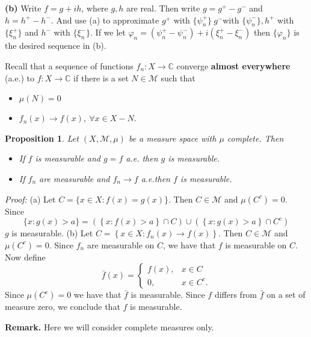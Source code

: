 \documentclass[12pt]{report}
\newtheorem{prop}[theorem]{Proposition}
\begin{document}
\bigskip
\noindent
\textbf{(b)}  Write $f = g + ih$, where $g, h$ are real.  Then write $g =
g^+ - g^-$ and
$h = h^+ - h^-$.  And use (a) to approximate $g^+$ with $\{\psi^+_n\}\ 
g^-$with
$\{\psi^-_n\}, h^+$ with $\{\xi^+_n\}$ and $h^-$ with $\{\xi^-_n\}$.  If we
let
$\varphi_n = (\psi^+_n - \psi_n^-) + i (\xi^+_n - \xi_n^-)$ then
$\{\varphi_n\}$ is the desired sequence in (b).


\medskip
\noindent Recall that a sequence of functions $f_n: X \longrightarrow
\mathbb{C}$ converge
\textbf{almost everywhere} (a.e.) to $f: X \longrightarrow \mathbb{C} $
if there is a set $N \in \mathcal{M}$ such that
\begin{itemize}
\item[(i)]  $\mu(N) = 0$
\item[(ii)]  $f_n (x) \longrightarrow f(x), \ \forall x \in X - N$.
\end{itemize}



\begin{prop}  Let $(X, \mathcal{M}, \mu)$ be a measure
space with
$\mu$ complete.  Then
\begin{itemize}
\item[(a)]   If $f$ is measurable and $g = f $ a.e. then $g$ is
measurable.
\item[(b)]   If $f_n$ are measurable and $f_n \longrightarrow f $
a.e.then $f$  is measurable.
\end{itemize}
\end{prop}

\textit{Proof:}  
(a) Let $C = \{x \in X: f(x) = g(x) \}$.  Then $C \in \mathcal{M}$
and $\mu (C^c) = 0$.  Since
\[
\{x: g(x) > a\} = \left ( \left \{x: f(x) > a\right \} \cap C \right ) \cup \left
( \left \{x: g(x) > a \right \} \cap C^c \right )
\]
$g$ is measurable.
(b)  Let $C = \left \{x \in X: f_n (x) \longrightarrow f(x) \right
\}$.  Then $C \in
\mathcal{M}$ and $\mu(C^c) = 0$.  Since $f_n$ are measurable on $C$, we
have that
$f$ is measurable on $C$.
Now define
\[
\bar f(x) = \left \{\begin{array}{ll} f(x), &x \in C\\ 0, &x \in
C^c.\end{array} \right .
\] Since $\mu(C^c) = 0$ we have that $\bar f$ is measurable.  Since $f$
differs from
$\bar f$ on a set of measure zero, we conclude that $f$ is measurable.

\medskip
\noindent
\textbf{Remark.}  Here we will consider complete measures only.
\end{document}
